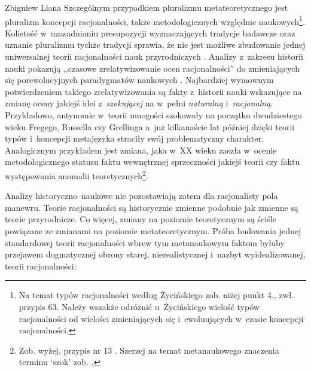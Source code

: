 \begin{artplenv}{Zbigniew Liana}
Szczególnym przypadkiem pluralizmu metateoretycznego jest pluralizm koncepcji racjonalności, także metodologicznych względnie naukowych\footnote{Na temat typów racjonalności według Życińskiego zob. niżej punkt 4., zwł. przypis 63. Należy wszakże odróżnić u~Życińskiego wielość typów racjonalności od wielości zmieniających się i~ewoluujących w~czasie koncepcji racjonalności.}. Kolistość w~uzasadnianiu presupozycji wyznaczających tradycje badawcze oraz uznanie pluralizmu tychże tradycji sprawia, że nie jest możliwe zbudowanie jednej uniwersalnej teorii racjonalności nauk przyrodniczych
\parencite[][s.~206.226]{zycinski_teizm_1985}. %
 Analizy z~zakresu historii nauki pokazują ,,czasowe zrelatywizowanie ocen racjonalności'' do zmieniających się porewolucyjnych paradygmatów naukowych 
\parencite[][s.~196n]{zycinski_teizm_1985}. %
 Najbardziej wymownym potwierdzeniem takiego zrelatywizowania są fakty z~historii nauki wskazujące na zmianę oceny jakiejś idei z~\textit{szokującej} na w~pełni \textit{naturalną} i~\textit{racjonalną}. Przykładowo, antynomie w~teorii mnogości szokowały na początku dwudziestego wieku Fregego, Russella czy Grellinga a~już kilkanaście lat później dzięki teorii typów i~koncepcji metajęzyka straciły swój problematyczny charakter. Analogicznym przykładem jest zmiana, jaka w~XX wieku zaszła w~ocenie metodologicznego statusu faktu wewnętrznej sprzeczności jakiejś teorii czy faktu występowania anomalii teoretycznych\footnote{Zob. wyżej, przypis nr 13%
. Szerzej na temat metanaukowego znaczenia terminu ‘szok' zob.
\parencite[][s.~163n.179n]{liana_nauka_2019_liana}.%
}.

Analizy historyczno–naukowe nie pozostawiają zatem dla racjonalisty pola manewru. Teorie racjonalności są historycznie zmienne podobnie jak zmienne są teorie przyrodnicze. Co więcej, zmiany na poziomie teoretycznym są ściśle powiązane ze zmianami na poziomie metateoretycznym. Próba budowania jednej standardowej teorii racjonalności wbrew tym metanaukowym faktom byłaby przejawem dogmatycznej obrony starej, nierealistycznej i~nazbyt wyidealizowanej, teorii racjonalności:




\end{artplenv}
